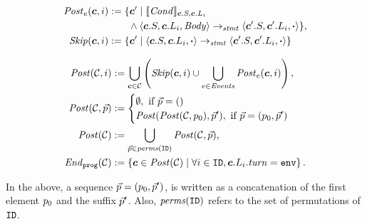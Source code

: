 \newcommand{\Skip}{\mathit{Skip}\xspace}
\begin{mdframed}[
    skipabove=5pt, skipbelow=5pt,
    innertopmargin=0pt,
    innerleftmargin=0pt, innerrightmargin=0pt
]
\footnotesize
\begin{align*}
    \Post_\Ev(\gconfig,i) &:= \{ \gconfig' \mid \eec{\EvCond}{\gconfig.S, \gconfig.\lconfig{i}} \\
      & \ \ \ \ \ \ \land \left\langle \gconfig.S, \gconfig.\lconfig{i}, \EvBody \right\rangle \stmtrule \left\langle \gconfig'.S, \gconfig'.\lconfig{i}, \EndEvent \right\rangle\}, \\
    \Skip(\gconfig,i) &:= \{ \gconfig' \mid \left\langle \gconfig.S, \gconfig.\lconfig{i}, \EndEvent \right\rangle \stmtrule \left\langle \gconfig'.S, \gconfig'.\lconfig{i}, \EndEvent \right\rangle \}
\end{align*}
\end{mdframed}

\begin{mdframed}[
    skipabove=5pt, skipbelow=5pt,
    innertopmargin=0pt,
    innerleftmargin=0pt, innerrightmargin=0pt
]
\footnotesize
\begin{align*}
    \Post(\gset,i) &:=  \bigcup_{\gconfig\in\gset} \left(\Skip(\gconfig, i) \cup \bigcup_{\Ev \in \Event} \Post_\Ev(\gconfig, i) \right),\\
    \Post(\gset,\pvec) &:= 
        \begin{cases}
            \emptyset, \text{ if } \pvec=()\\
            \Post(\Post(\gset,\pinit),\pvec'), \text{ if } \pvec=(\pinit, \pvec')\\
        \end{cases}\\
    \Post(\gset) &:=  \bigcup_{\pvec\in \mathit{perms}(\UINS)} \Post(\gset,\pvec), \\
    \Final(\gset) &:=  \left\{ \gconfig\in \Post(\gset)\mid \forall i \in \UINS, \gconfig.\lconfig{i}.\turn = \env \right\}.
\end{align*}
\end{mdframed}
In the above, a sequence $\vec{p}=(p_0, \vec{p}')$, is written  as a concatenation of the first element $p_0$ and the suffix $\vec{p}'$.
Also, $\mathit{perms}(\texttt{ID})$ refers to the set of permutations of $\texttt{ID}$.

